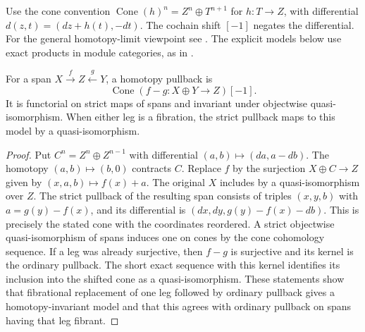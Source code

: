 Use the cone convention
\(\operatorname{Cone}(h)^n=Z^n\oplus T^{n+1}\)
for \(h:T\to Z\), with differential
\(d(z,t)=(dz+h(t),-dt)\).
The cochain shift \([-1]\) negates the differential.
For the general homotopy-limit viewpoint see
\cite[Chapters 5--6]{riehl}. The explicit models below use exact
products in module categories, as in \cite[Section 34]{st-derived}.

\begin{proposition}\label{res:Q16}
For a span \(X\xrightarrow{f} Z\xleftarrow{g}Y\),
a homotopy pullback is
\[
 \operatorname{Cone}(f-g:X\oplus Y\longrightarrow Z)[-1].
\]
It is functorial on strict maps of spans and invariant under
objectwise quasi-isomorphism. When either leg is a fibration,
the strict pullback maps to this model by a quasi-isomorphism.
\end{proposition}
\begin{proof}
Put \(C^n=Z^n\oplus Z^{n-1}\) with differential
\((a,b)\mapsto(da,a-db)\). The homotopy
\((a,b)\mapsto(b,0)\) contracts \(C\). Replace \(f\)
by the surjection \(X\oplus C\to Z\) given by
\((x,a,b)\mapsto f(x)+a\). The original \(X\) includes
by a quasi-isomorphism over \(Z\). The strict pullback
of the resulting span consists of triples
\((x,y,b)\) with \(a=g(y)-f(x)\), and its differential
is \((dx,dy,g(y)-f(x)-db)\). This is precisely the
stated cone with the coordinates reordered.
A strict objectwise quasi-isomorphism of spans induces
one on cones by the cone cohomology sequence.
If a leg was already surjective, then \(f-g\)
is surjective and its kernel is the ordinary pullback.
The short exact sequence with this kernel identifies
its inclusion into the shifted cone as a quasi-isomorphism.
These statements show that fibrational replacement
of one leg followed by ordinary pullback gives a
homotopy-invariant model and that this agrees with
ordinary pullback on spans having that leg fibrant.
\end{proof}

